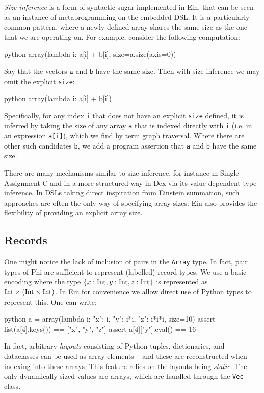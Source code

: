 \textit{Size inference} is a form of syntactic sugar implemented in Ein, that can be seen as an instance of metaprogramming on the embedded DSL. It is a particularly common pattern, where a newly defined array shares the same size as the one that we are operating on. For example, consider the following computation:
\begin{center} 
\begin{cminted}{python}
array(lambda i: a[i] + b[i], size=a.size(axis=0))
\end{cminted} 
\end{center}
Say that the vectors $\texttt{a}$ and $\texttt{b}$ have the same size. Then with size inference we may omit the explicit \texttt{size}:
\begin{center} 
\begin{cminted}{python}
array(lambda i: a[i] + b[i])
\end{cminted} 
\end{center}
Specifically, for any index \texttt{i} that does not have an explicit \texttt{size} defined, it is inferred by taking the size of any array \texttt{a} that is indexed directly with \texttt{i} (i.e. in an expression \texttt{a[i]}), which we find by term graph traversal. Where there are other such candidates \texttt{b}, we add a program assertion that \texttt{a} and \texttt{b} have the same size.

There are many mechanisms similar to size inference, for instance in Single-Assignment C and in a more structured way in Dex via its value-dependent type inference. In DSLs taking direct inspiration from Einstein summation, such approaches are often the only way of specifying array sizes. Ein also provides the flexibility of providing an explicit array size.

\subsection{Records}

One might notice the lack of inclusion of pairs in the \texttt{Array} type. In fact, pair types of Phi are sufficient to represent (labelled) record types. We use a basic encoding where the type $\{ x: \mathrm{Int}, y: \mathrm{Int}, z: \mathrm{Int} \}$ is represented as $\phipairtype{\phiinttype}{\left( \phiinttype \times \phiinttype \right)}$. In Ein for convenience we allow direct use of Python types to represent this. One can write:
\begin{center} 
\begin{cminted}{python}
a = array(lambda i: {"x": i, "y": i*i, "z": i*i*i}, size=10)
assert list(a[4].keys()) == ["x", "y", "z"]
assert a[4]["y"].eval() == 16
\end{cminted}
\end{center}
In fact, arbitrary \textit{layouts} consisting of Python tuples, dictionaries, and dataclasses can be used as array elements -- and these are reconstructed when indexing into these arrays. This feature relies on the layouts being \textit{static}. The only dynamically-sized values are arrays, which are handled through the \texttt{Vec} class. 

